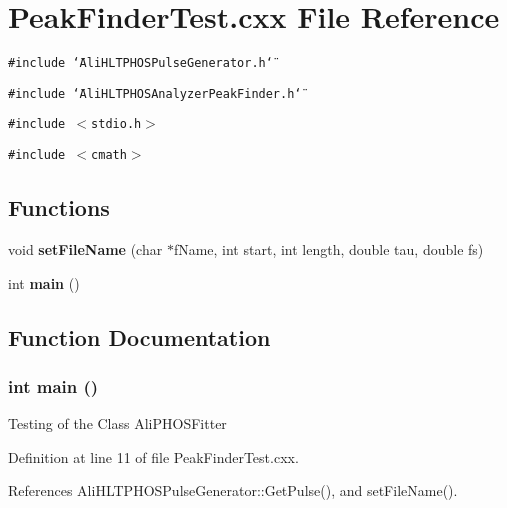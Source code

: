 \section{Peak\-Finder\-Test.cxx File Reference}
\label{PeakFinderTest_8cxx}


{\tt \#include \char`\"{}Ali\-HLTPHOSPulse\-Generator.h\char`\"{}}\par
{\tt \#include \char`\"{}Ali\-HLTPHOSAnalyzer\-Peak\-Finder.h\char`\"{}}\par
{\tt \#include $<$stdio.h$>$}\par
{\tt \#include $<$cmath$>$}\par
\subsection*{Functions}
\begin{CompactItemize}
\item 
void {\bf set\-File\-Name} (char $\ast$f\-Name, int start, int length, double tau, double fs)
\item 
int {\bf main} ()
\end{CompactItemize}


\subsection{Function Documentation}
\subsubsection{\setlength{\rightskip}{0pt plus 5cm}int main ()}\label{PeakFinderTest_8cxx_a1}


Testing of the Class Ali\-PHOSFitter 

Definition at line 11 of file Peak\-Finder\-Test.cxx.

References Ali\-HLTPHOSPulse\-Generator::Get\-Pulse(), and set\-File\-Name().

